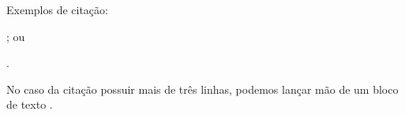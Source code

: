 \documentclass[
    12pt,               %
    openright,          %
    oneside,            %
    a4paper,            %
    english,            %
    french,             %
    spanish,            %
    brazil              %
    ]{abntex2}
\begin{document}
\begin{anexosenv}
Exemplos de cita\c cão: 

\cite[p. 10]{author2020}; ou 

.

\begin{citacao}
No caso da cita\c cão possuir mais de três linhas, podemos lan\c car mão de um bloco de texto \cite[p. 44]{author2020}.
\end{citacao}

\end{anexosenv}

\printindex
\end{document}
